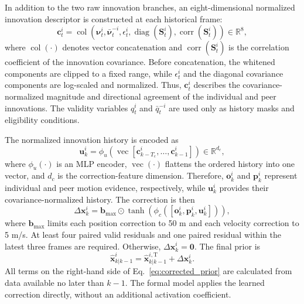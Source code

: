\documentclass[10pt,doublecolumn]{IEEEtaes}
\begin{document}
In addition to the two raw innovation branches, an eight-dimensional normalized innovation descriptor is constructed at each historical frame:
\begin{equation}
\mathbf{c}_t^i=\operatorname{col}\left(
\boldsymbol{\nu}_t^i,\bar{\boldsymbol{\nu}}_t^{-i},\epsilon_t^i,
\operatorname{diag}(\mathbf{S}_t^i),
\operatorname{corr}(\mathbf{S}_t^i)
\right)\in\mathbb{R}^{8},
\label{eq:innovation_descriptor}
\end{equation}
where $\operatorname{col}(\cdot)$ denotes vector concatenation and $\operatorname{corr}(\mathbf{S}_t^i)$ is the correlation coefficient of the innovation covariance. Before concatenation, the whitened components are clipped to a fixed range, while $\epsilon_t^i$ and the diagonal covariance components are log-scaled and normalized. Thus, $\mathbf{c}_t^i$ describes the covariance-normalized magnitude and directional agreement of the individual and peer innovations. The validity variables $q_t^i$ and $\bar q_t^{-i}$ are used only as history masks and eligibility conditions.

The normalized innovation history is encoded as
\begin{equation}
\mathbf{u}_k^i=\phi_u\!\left(
\operatorname{vec}[\mathbf{c}_{k-T_{\mathrm{c}}}^i,\ldots,\mathbf{c}_{k-1}^i]
\right)\in\mathbb{R}^{d_c},
\label{eq:normalized_innovation_history}
\end{equation}
where $\phi_u(\cdot)$ is an MLP encoder, $\operatorname{vec}(\cdot)$ flattens the ordered history into one vector, and $d_c$ is the correction-feature dimension. Therefore, $\mathbf{o}_k^i$ and $\mathbf{p}_k^i$ represent individual and peer motion evidence, respectively, while $\mathbf{u}_k^i$ provides their covariance-normalized history. The correction is then
\begin{equation}
\Delta\mathbf{x}_{k}^{i}=\mathbf{b}_{\max}\odot
\tanh\!\left(\phi_c([\mathbf{o}_{k}^{i},\mathbf{p}_{k}^{i},\mathbf{u}_{k}^{i}])\right),
\label{eq:causal_correction}
\end{equation}
where $\mathbf{b}_{\max}$ limits each position correction to 50 m and each velocity correction to 5 m/s. At least four paired valid residuals and one paired residual within the latest three frames are required. Otherwise, $\Delta\mathbf{x}_{k}^{i}=\mathbf{0}$. The final prior is
\begin{equation}
\hat{\mathbf{x}}_{k|k-1}^{i}=
\hat{\mathbf{x}}_{k|k-1}^{i,\mathrm{T}}+\Delta\mathbf{x}_{k}^{i}.
\label{eq:corrected_prior}
\end{equation}
All terms on the right-hand side of Eq.~\eqref{eq:corrected_prior} are calculated from data available no later than $k-1$. The formal model applies the learned correction directly, without an additional activation coefficient.
\end{document}
